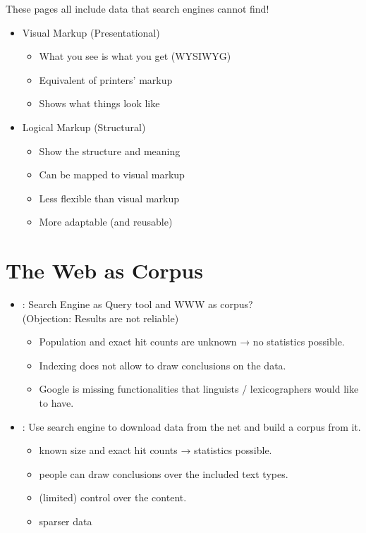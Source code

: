 \documentclass[a4paper,landscape,headrule,footrule,xetex]{foils}
\begin{document}
These pages all include data that search engines cannot find!


\begin{itemize}
\item Visual Markup (Presentational)
  \begin{itemize}
  \item What you see is what you get (WYSIWYG)
  \item Equivalent of printers' markup
  \item Shows what things look like
  \end{itemize}
\item Logical Markup (Structural)
  \begin{itemize}
  \item Show the structure and meaning
  \item Can be mapped to visual markup
  \item Less flexible than visual markup
  \item More adaptable (and reusable)
  \end{itemize}
\end{itemize}




\section{The Web as Corpus}
\begin{itemize}
\item {}: Search Engine as Query tool and WWW as corpus?
\\  (Objection: Results are not reliable)
\begin{itemize}
\item Population and exact hit counts are unknown → no statistics
possible.
\item Indexing does not allow to draw conclusions on the data.
\item[\Bad] Google is missing functionalities that linguists /
lexicographers would like to have.
\end{itemize}
\item {}: Use search engine to download data from the
net and build a corpus from it.
\begin{itemize}
\item known size and exact hit counts → statistics possible.
\item people can draw conclusions over the included text types.
\item (limited) control over the content.
\item[\Bad] sparser data
\end{itemize}
\end{itemize}
\end{document}

